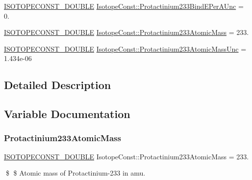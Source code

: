 \begin{DoxyCompactItemize}
\item 
\mbox{\hyperlink{group___isotope_const-_macros_ga8f45a7272ce02c0b4c65c44636ed719a}{I\+S\+O\+T\+O\+P\+E\+C\+O\+N\+S\+T\+\_\+\+D\+O\+U\+B\+LE}} \mbox{\hyperlink{group___isotope_const-_protactinium-_pa233_ga8d52215163ba009e1645a5868f34aca8}{Isotope\+Const\+::\+Protactinium233\+Bind\+E\+Per\+A\+Unc}} = 0.
\item 
\mbox{\hyperlink{group___isotope_const-_macros_ga8f45a7272ce02c0b4c65c44636ed719a}{I\+S\+O\+T\+O\+P\+E\+C\+O\+N\+S\+T\+\_\+\+D\+O\+U\+B\+LE}} \mbox{\hyperlink{group___isotope_const-_protactinium-_pa233_ga3d142442023a73a1fcc5abdc311efe5f}{Isotope\+Const\+::\+Protactinium233\+Atomic\+Mass}} = 233.
\item 
\mbox{\hyperlink{group___isotope_const-_macros_ga8f45a7272ce02c0b4c65c44636ed719a}{I\+S\+O\+T\+O\+P\+E\+C\+O\+N\+S\+T\+\_\+\+D\+O\+U\+B\+LE}} \mbox{\hyperlink{group___isotope_const-_protactinium-_pa233_ga867bf6e07de04f812a1a62efde2a58a1}{Isotope\+Const\+::\+Protactinium233\+Atomic\+Mass\+Unc}} = 1.\+434e-\/06
\end{DoxyCompactItemize}


\subsection{Detailed Description}


\subsection{Variable Documentation}
\mbox{\label{group___isotope_const-_protactinium-_pa233_ga3d142442023a73a1fcc5abdc311efe5f}} 
\subsubsection{\texorpdfstring{Protactinium233\+Atomic\+Mass}{Protactinium233AtomicMass}}
{\footnotesize\ttfamily \mbox{\hyperlink{group___isotope_const-_macros_ga8f45a7272ce02c0b4c65c44636ed719a}{I\+S\+O\+T\+O\+P\+E\+C\+O\+N\+S\+T\+\_\+\+D\+O\+U\+B\+LE}} Isotope\+Const\+::\+Protactinium233\+Atomic\+Mass = 233.}

\$ \$ Atomic mass of Protactinium-\/233 in amu. \mbox{\label{group___isotope_const-_protactinium-_pa233_ga867bf6e07de04f812a1a62efde2a58a1}} 
